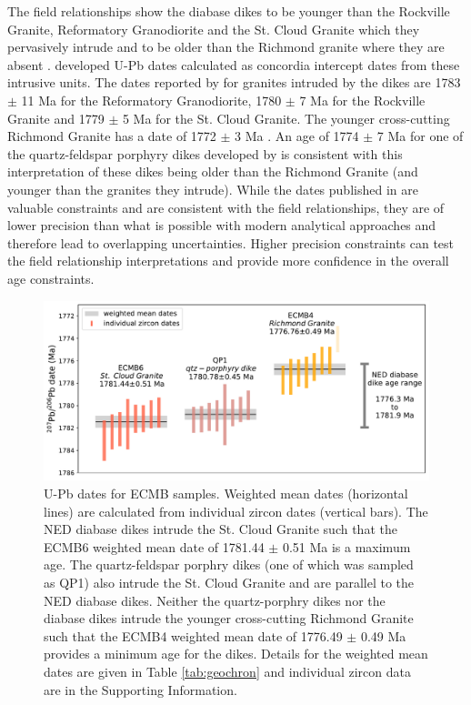 \documentclass[draft]{agujournal2019}
\begin{document}
The field relationships show the diabase dikes to be younger than the Rockville Granite, Reformatory Granodiorite and the St. Cloud Granite which they pervasively intrude and to be older than the Richmond granite where they are absent \cite{Boerboom2005b}.  developed U-Pb dates calculated as concordia intercept dates from these intrusive units. The dates reported by  for granites intruded by the dikes are 1783 $\pm$ 11 Ma for the Reformatory Granodiorite, 1780 $\pm$ 7 Ma for the Rockville Granite and 1779 $\pm$ 5 Ma for the St. Cloud Granite. The younger cross-cutting Richmond Granite has a date of 1772 $\pm$ 3 Ma \cite{Holm2005a}. An age of 1774 $\pm$ 7 Ma for one of the quartz-feldspar porphyry dikes developed by \cite{Holm2005a} is consistent with this interpretation of these dikes being older than the Richmond Granite (and younger than the granites they intrude). While the dates published in  are valuable constraints and are consistent with the field relationships, they are of lower precision than what is possible with modern analytical approaches and therefore lead to overlapping uncertainties. Higher precision constraints can test the field relationship interpretations and provide more confidence in the overall age constraints.

\begin{figure}[!ht]
\centering
\noindent\includegraphics[width=\textwidth]{./figures/ECMB_new_U_Pb_dates.pdf}
\caption{\small{U-Pb dates for ECMB samples. Weighted mean dates (horizontal lines) are calculated from individual zircon dates (vertical bars). The NED diabase dikes intrude the St. Cloud Granite such that the ECMB6 weighted mean date of 1781.44 $\pm$ 0.51 Ma is a maximum age. The quartz-feldspar porphry dikes (one of which was sampled as QP1) also intrude the St. Cloud Granite and are parallel to the NED diabase dikes. Neither the quartz-porphry dikes nor the diabase dikes intrude the younger cross-cutting Richmond Granite such that the ECMB4 weighted mean date of 1776.49 $\pm$ 0.49 Ma provides a minimum age for the dikes. Details for the weighted mean dates are given in Table \ref{tab:geochron} and individual zircon data are in the Supporting Information.}}
\label{fig:U_Pb_dates}
\end{figure}
\end{document}

